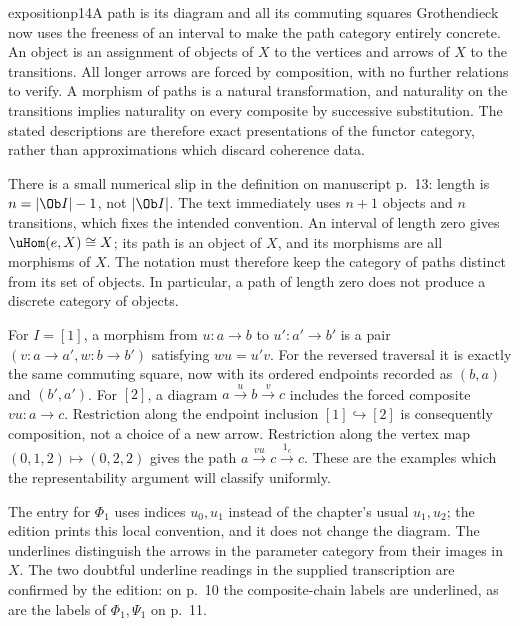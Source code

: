 \begin{dcomment}{exposition}{p14}{A path is its diagram and all its commuting squares}
Grothendieck now uses the freeness of an interval to make the path category entirely concrete. An object is an assignment of objects of $X$ to the vertices and arrows of $X$ to the transitions. All longer arrows are forced by composition, with no further relations to verify. A morphism of paths is a natural transformation, and naturality on the transitions implies naturality on every composite by successive substitution. The stated descriptions are therefore exact presentations of the functor category, rather than approximations which discard coherence data.

There is a small numerical slip in the definition on manuscript p.~13: length is $n=|\Ob I|-1$, not $|\Ob I|$. The text immediately uses $n+1$ objects and $n$ transitions, which fixes the intended convention. An interval of length zero gives $\uHom(e,X)\cong X$; its path is an object of $X$, and its morphisms are all morphisms of $X$. The notation must therefore keep the category of paths distinct from its set of objects. In particular, a path of length zero does not produce a discrete category of objects.

For $I=[1]$, a morphism from $u:a\to b$ to $u':a'\to b'$ is a pair $(v:a\to a',w:b\to b')$ satisfying $wu=u'v$. For the reversed traversal it is exactly the same commuting square, now with its ordered endpoints recorded as $(b,a)$ and $(b',a')$. For $[2]$, a diagram $a\xrightarrow{u}b\xrightarrow{v}c$ includes the forced composite $vu:a\to c$. Restriction along the endpoint inclusion $[1]\hookrightarrow[2]$ is consequently composition, not a choice of a new arrow. Restriction along the vertex map $(0,1,2)\mapsto(0,2,2)$ gives the path $a\xrightarrow{vu}c\xrightarrow{1_c}c$. These are the examples which the representability argument will classify uniformly.

The entry for $\Phi_1$ uses indices $u_0,u_1$ instead of the chapter's usual $u_1,u_2$; the edition prints this local convention, and it does not change the diagram. The underlines distinguish the arrows in the parameter category from their images in $X$. The two doubtful underline readings in the supplied transcription are confirmed by the edition: on p.~10 the composite-chain labels are underlined, as are the labels of $\Phi_1,\Psi_1$ on p.~11.
\end{dcomment}

